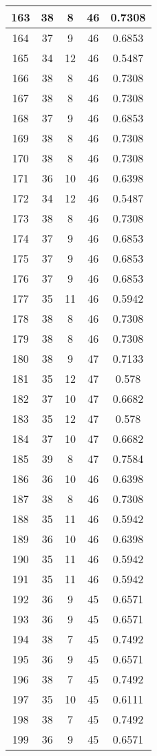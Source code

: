 \documentclass[letterpaper, 12pt]{article}
\begin{document}
\begin{longtable}{|c|c|c|c|c|}
\hline
163 & 38 & 8 & 46 & 0.7308 \\
\hline
164 & 37 & 9 & 46 & 0.6853 \\
\hline
165 & 34 & 12 & 46 & 0.5487 \\
\hline
166 & 38 & 8 & 46 & 0.7308 \\
\hline
167 & 38 & 8 & 46 & 0.7308 \\
\hline
168 & 37 & 9 & 46 & 0.6853 \\
\hline
169 & 38 & 8 & 46 & 0.7308 \\
\hline
170 & 38 & 8 & 46 & 0.7308 \\
\hline
171 & 36 & 10 & 46 & 0.6398 \\
\hline
172 & 34 & 12 & 46 & 0.5487 \\
\hline
173 & 38 & 8 & 46 & 0.7308 \\
\hline
174 & 37 & 9 & 46 & 0.6853 \\
\hline
175 & 37 & 9 & 46 & 0.6853 \\
\hline
176 & 37 & 9 & 46 & 0.6853 \\
\hline
177 & 35 & 11 & 46 & 0.5942 \\
\hline
178 & 38 & 8 & 46 & 0.7308 \\
\hline
179 & 38 & 8 & 46 & 0.7308 \\
\hline
180 & 38 & 9 & 47 & 0.7133 \\
\hline
181 & 35 & 12 & 47 & 0.578 \\
\hline
182 & 37 & 10 & 47 & 0.6682 \\
\hline
183 & 35 & 12 & 47 & 0.578 \\
\hline
184 & 37 & 10 & 47 & 0.6682 \\
\hline
185 & 39 & 8 & 47 & 0.7584 \\
\hline
186 & 36 & 10 & 46 & 0.6398 \\
\hline
187 & 38 & 8 & 46 & 0.7308 \\
\hline
188 & 35 & 11 & 46 & 0.5942 \\
\hline
189 & 36 & 10 & 46 & 0.6398 \\
\hline
190 & 35 & 11 & 46 & 0.5942 \\
\hline
191 & 35 & 11 & 46 & 0.5942 \\
\hline
192 & 36 & 9 & 45 & 0.6571 \\
\hline
193 & 36 & 9 & 45 & 0.6571 \\
\hline
194 & 38 & 7 & 45 & 0.7492 \\
\hline
195 & 36 & 9 & 45 & 0.6571 \\
\hline
196 & 38 & 7 & 45 & 0.7492 \\
\hline
197 & 35 & 10 & 45 & 0.6111 \\
\hline
198 & 38 & 7 & 45 & 0.7492 \\
\hline
199 & 36 & 9 & 45 & 0.6571 \\
\hline
\end{longtable}
\end{document}
